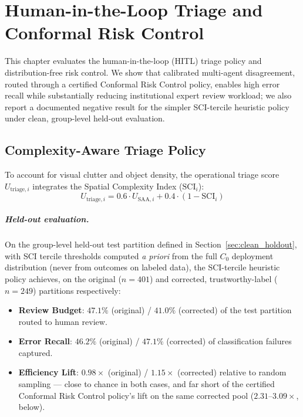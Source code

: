 \documentclass[12pt,a4paper]{report}
\begin{document}
\chapter{Human-in-the-Loop Triage and Conformal Risk Control}
\label{ch:triage_risk_control}

This chapter evaluates the human-in-the-loop (HITL) triage policy and distribution-free risk control. We show that calibrated multi-agent disagreement, routed through a certified Conformal Risk Control policy, enables high error recall while substantially reducing institutional expert review workload; we also report a documented negative result for the simpler SCI-tercile heuristic policy under clean, group-level held-out evaluation.

\section{Complexity-Aware Triage Policy}
\label{sec:complexity_triage}
To account for visual clutter and object density, the operational triage score $U_{\text{triage}, i}$ integrates the Spatial Complexity Index ($\text{SCI}_i$):
\begin{equation}
    U_{\text{triage}, i} = 0.6 \cdot U_{\text{SAA}, i} + 0.4 \cdot (1 - \text{SCI}_i)
\end{equation}

\paragraph{Held-out evaluation.} On the group-level held-out test partition defined in Section~\ref{sec:clean_holdout}, with SCI tercile thresholds computed \emph{a priori} from the full $C_0$ deployment distribution (never from outcomes on labeled data), the SCI-tercile heuristic policy achieves, on the original ($n=401$) and corrected, trustworthy-label ($n=249$) partitions respectively:
\begin{itemize}
    \item \textbf{Review Budget}: $47.1\%$ (original) / $41.0\%$ (corrected) of the test partition routed to human review.
    \item \textbf{Error Recall}: $46.2\%$ (original) / $47.1\%$ (corrected) of classification failures captured.
    \item \textbf{Efficiency Lift}: $0.98\times$ (original) / $1.15\times$ (corrected) relative to random sampling --- close to chance in both cases, and far short of the certified Conformal Risk Control policy's lift on the same corrected pool ($2.31$--$3.09\times$, below).
\end{itemize}
\end{document}
